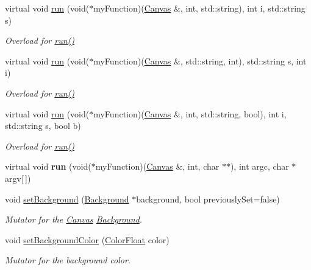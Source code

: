 \begin{DoxyCompactItemize}
virtual void \hyperlink{classtsgl_1_1_canvas_ac507bbbf60328de2fc99f93cd37d04ec}{run} (void($\ast$my\+Function)(\hyperlink{classtsgl_1_1_canvas}{Canvas} \&, int, std\+::string), int i, std\+::string s)
\begin{DoxyCompactList}\small\item\em Overload for \hyperlink{classtsgl_1_1_canvas_a5f3f00d6c380a662a239077456045502}{run()} \end{DoxyCompactList}\item 
virtual void \hyperlink{classtsgl_1_1_canvas_aafed71cba89b059629647e77ba23ff2b}{run} (void($\ast$my\+Function)(\hyperlink{classtsgl_1_1_canvas}{Canvas} \&, std\+::string, int), std\+::string s, int i)
\begin{DoxyCompactList}\small\item\em Overload for \hyperlink{classtsgl_1_1_canvas_a5f3f00d6c380a662a239077456045502}{run()} \end{DoxyCompactList}\item 
virtual void \hyperlink{classtsgl_1_1_canvas_ae8de87e9e5c42cc8f1bf4e18cb8805e2}{run} (void($\ast$my\+Function)(\hyperlink{classtsgl_1_1_canvas}{Canvas} \&, int, std\+::string, bool), int i, std\+::string s, bool b)
\begin{DoxyCompactList}\small\item\em Overload for \hyperlink{classtsgl_1_1_canvas_a5f3f00d6c380a662a239077456045502}{run()} \end{DoxyCompactList}\item 
\mbox{\label{classtsgl_1_1_canvas_adb1b2e1dedf4431d266aa3cc59c88637}} 
virtual void {\bfseries run} (void($\ast$my\+Function)(\hyperlink{classtsgl_1_1_canvas}{Canvas} \&, int, char $\ast$$\ast$), int argc, char $\ast$argv\mbox{[}$\,$\mbox{]})
\item 
void \hyperlink{classtsgl_1_1_canvas_af03da8ddf3123c5d5bb2aa734d322b92}{set\+Background} (\hyperlink{classtsgl_1_1_background}{Background} $\ast$background, bool previously\+Set=false)
\begin{DoxyCompactList}\small\item\em Mutator for the \hyperlink{classtsgl_1_1_canvas}{Canvas} \hyperlink{classtsgl_1_1_background}{Background}. \end{DoxyCompactList}\item 
void \hyperlink{classtsgl_1_1_canvas_abb668fe42e2fe7f269b255152df959d8}{set\+Background\+Color} (\hyperlink{structtsgl_1_1_color_float}{Color\+Float} color)
\begin{DoxyCompactList}\small\item\em Mutator for the background color. \end{DoxyCompactList}\item 
$$
\end{DoxyCompactItemize}
